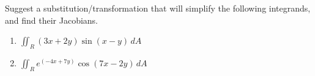 Suggest a substitution/transformation that will simplify the following integrands, and find their Jacobians.

\begin{enumerate}[label=(\alph*), itemsep=0.4em, topsep=0.5em]
	\item $\displaystyle \iint_R (3x + 2y) \sin(x - y)\, dA$
	\item $\displaystyle \iint_R e^{(-4x + 7y)} \cos(7x - 2y)\, dA$
\end{enumerate}


